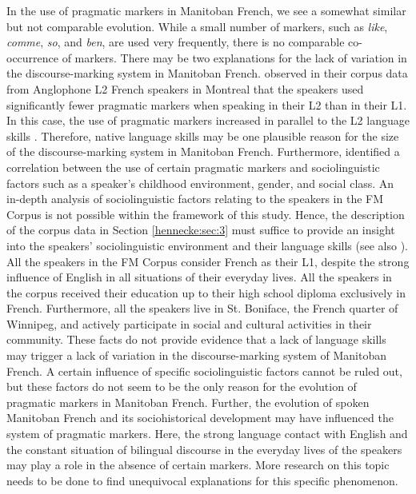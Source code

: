 \documentclass[output=paper]{langscibook}
\begin{document}
In the use of pragmatic markers in Manitoban French, we see a somewhat similar but not comparable evolution. While a small number of markers, such as \textit{like}, \textit{comme}, \textit{so}, and \textit{ben}, are used very frequently, there is no comparable co-occurrence of markers. There may be two explanations for the lack of variation in the discourse-marking system in Manitoban French. \citet{Sankoff.1997} observed in their corpus data from Anglophone L2 French speakers in Montreal that the speakers used significantly fewer pragmatic markers when speaking in their L2 than in their L1. In this case, the use of pragmatic markers increased in parallel to the L2 language skills \citep[213]{Sankoff.1997}. Therefore, native language skills may be one plausible reason for the size of the discourse-marking system in Manitoban French. Furthermore, \citet[214]{Sankoff.1997} identified a correlation between the use of certain pragmatic markers and sociolinguistic factors such as a speaker’s childhood environment, gender, and social class. An in-depth analysis of sociolinguistic factors relating to the speakers in the FM Corpus is not possible within the framework of this study. Hence, the description of the corpus data in Section \ref{hennecke:sec:3} must suffice to provide an insight into the speakers’ sociolinguistic environment and their language skills (see also \citealt{Hennecke.2014}). All the speakers in the FM Corpus consider French as their L1, despite the strong influence of English in all situations of their everyday lives. All the speakers in the corpus received their education up to their high school diploma exclusively in French. Furthermore, all the speakers live in St. Boniface, the French quarter of Winnipeg, and actively participate in social and cultural activities in their community. These facts do not provide evidence that a lack of language skills may trigger a lack of variation in the discourse-marking system of Manitoban French. A certain influence of specific sociolinguistic factors cannot be ruled out, but these factors do not seem to be the only reason for the evolution of pragmatic markers in Manitoban French. Further, the evolution of spoken Manitoban French and its sociohistorical development may have influenced the system of pragmatic markers. Here, the strong language contact with English and the constant situation of bilingual discourse in the everyday lives of the speakers may play a role in the absence of certain markers. More research on this topic needs to be done to find unequivocal explanations for this specific phenomenon.
\end{document}
